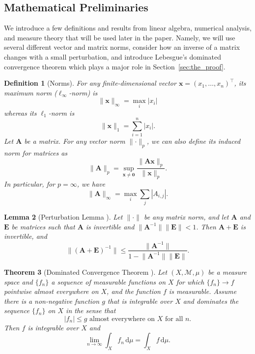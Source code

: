 \documentclass{mpaper}
\newtheorem{theorem}{Theorem}[section]
\newtheorem{lemma}[theorem]{Lemma}
\newtheorem{definition}[theorem]{Definition}
\begin{document}
\subsection{Mathematical Preliminaries} \label{sec:math_preliminaries}

We introduce a few definitions and results from linear algebra, numerical
analysis, and measure theory that will be used later in the paper. Namely, we
will use several different vector and matrix norms, consider how an inverse of a
matrix changes with a small perturbation, and introduce Lebesgue's dominated
convergence theorem which plays a major role in Section~\ref{sec:the_proof}.

\begin{definition}[Norms]
  For any finite-dimensional vector $\mathbf{x} = (x_1, \dots, x_n)^\intercal$,
  its \emph{maximum norm} (\emph{$\ell_\infty$-norm}) is
  \[
    \lVert \mathbf{x} \rVert_\infty = \max_i |x_i|
  \]
  whereas its \emph{$\ell_1$-norm} is
  \[
    \lVert \mathbf{x} \rVert_1 = \sum_{i = 1}^n |x_i|.
  \]
  Let $\mathbf{A}$ be a matrix. For any vector norm $\lVert
  \cdot \rVert_p$, we can also define its \emph{induced norm} for matrices as
  \[
    \lVert \mathbf{A} \rVert_p = \sup_{\mathbf{x} \ne \mathbf{0}} \frac{\lVert
      \mathbf{Ax} \rVert_p}{\lVert \mathbf{x} \rVert_p}.
  \]
  In particular, for $p = \infty$, we have
  \[
    \lVert \mathbf{A} \rVert_\infty = \max_i \sum_{j} |A_{i,j}|.
  \]
\end{definition}

\begin{lemma}[Perturbation Lemma
  \cite{layton2014numerical}] \label{lemma:perturbation}
  Let $\lVert \cdot \rVert$ be any matrix norm, and let $\mathbf{A}$ and
  $\mathbf{E}$ be matrices such that $\mathbf{A}$ is invertible and $\lVert
  \mathbf{A}^{-1} \rVert \lVert \mathbf{E} \rVert < 1$. Then $\mathbf{A} +
  \mathbf{E}$ is invertible, and
  \[
    \lVert (\mathbf{A} + \mathbf{E})^{-1} \rVert \le \frac{\lVert
      \mathbf{A}^{-1} \rVert}{1 - \lVert \mathbf{A}^{-1} \rVert \lVert
      \mathbf{E} \rVert}.
  \]
\end{lemma}

\begin{theorem}[Dominated Convergence Theorem
  \cite{royden2010real}] \label{thm:lebesgue}
  Let $(X, \mathcal{M}, \mu)$ be a measure space and $\{ f_n \}$ a sequence of
  measurable functions on $X$ for which $\{ f_n \} \to f$ pointwise almost
  everywhere on $X$, and the function $f$ is measurable. Assume there is a
  non-negative function $g$ that is integrable over $X$ and dominates the
  sequence $\{ f_n \}$ on $X$ in the sense that
  \[
    |f_n| \le g \text{ almost everywhere on $X$ for all $n$.}
  \]
  Then $f$ is integrable over $X$ and
  \[
    \lim_{n \to \infty} \int_X f_n\,\mathrm{d}\mu = \int_X f\,\mathrm{d}\mu.
  \]
\end{theorem}
\end{document}
